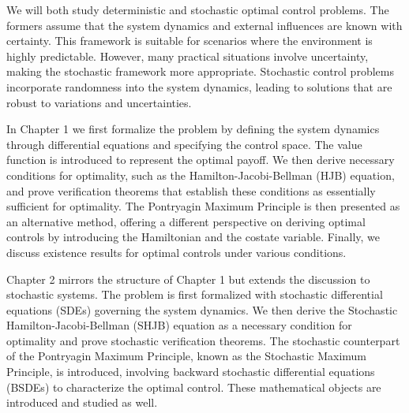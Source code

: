 \documentclass[12pt,a4paper,oneside]{book}
\numberwithin{theorem}{section}
\numberwithin{definition}{section}
\numberwithin{example}{section}
\numberwithin{exercise}{section}
\begin{document}
We will both study deterministic and stochastic optimal control problems. The formers assume that the system dynamics and external influences are known with certainty. This framework is suitable for scenarios where the environment is highly predictable. However, many practical situations involve uncertainty, making the stochastic framework more appropriate. Stochastic control problems incorporate randomness into the system dynamics, leading to solutions that are robust to variations and uncertainties.

In Chapter 1 we first formalize the problem by defining the system dynamics through differential equations and specifying the control space. The value function is introduced to represent the optimal payoff. We then derive necessary conditions for optimality, such as the Hamilton-Jacobi-Bellman (HJB) equation, and prove verification theorems that establish these conditions as essentially sufficient for optimality. The Pontryagin Maximum Principle is then presented as an alternative method, offering a different perspective on deriving optimal controls by introducing the Hamiltonian and the costate variable. Finally, we discuss existence results for optimal controls under various conditions.

Chapter 2 mirrors the structure of Chapter 1 but extends the discussion to stochastic systems. The problem is first formalized with stochastic differential equations (SDEs) governing the system dynamics. We then derive the Stochastic Hamilton-Jacobi-Bellman (SHJB) equation as a necessary condition for optimality and prove stochastic verification theorems. The stochastic counterpart of the Pontryagin Maximum Principle, known as the Stochastic Maximum Principle, is introduced, involving backward stochastic differential equations (BSDEs) to characterize the optimal control. These mathematical objects are introduced and studied as well. 
\end{document}
